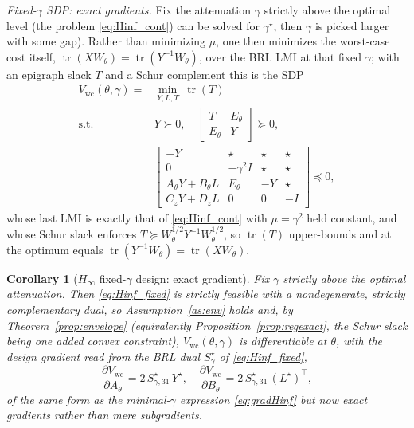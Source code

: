 \documentclass[twocolumn,amsthm]{autart}
\newtheorem{corollary}{Corollary}
\begin{document}
\emph{Fixed-$\gamma$ SDP: exact gradients.} Fix the attenuation $\gamma$
strictly above the optimal level (the problem \eqref{eq:Hinf_cont}) can be solved for $\gamma^\star$, then $\gamma$ is picked larger with some gap). Rather than minimizing $\mu$, one then
minimizes the worst-case cost itself,
$\operatorname{tr}(XW_\theta)=\operatorname{tr}(Y^{-1}W_\theta)$, over the BRL LMI at
that fixed $\gamma$; with an epigraph slack $T$ and a Schur complement this is the SDP
\begin{equation}\label{eq:Hinf_fixed}
\begin{aligned}
V_{\mathrm{wc}}(\theta, \gamma)=&\min_{Y,L,T}\ \operatorname{tr}(T)\\
\text{s.t. } & Y\succ0,\quad
\begin{bmatrix} T & E_\theta\\ E_\theta & Y\end{bmatrix}\succeq0,\\
& \begin{bmatrix}
-Y & \star & \star & \star \\
0 & -\gamma^2 I & \star & \star \\
A_\theta Y + B_\theta L & E_\theta & -Y & \star \\
C_z Y + D_z L & 0 & 0 & -I
\end{bmatrix} \preceq 0,
\end{aligned}
\end{equation}
whose last LMI is exactly that of \eqref{eq:Hinf_cont} with $\mu=\gamma^2$ held
constant, and whose Schur slack enforces
$T\succeq W_\theta^{1/2}Y^{-1}W_\theta^{1/2}$, so $\operatorname{tr}(T)$ upper-bounds and at the optimum equals $\operatorname{tr}(Y^{-1}W_\theta)=\operatorname{tr}(XW_\theta)$.

\begin{corollary}[$H_\infty$ fixed-$\gamma$ design: exact gradient]\label{cor:hinf_fixed}
Fix $\gamma$ strictly above the optimal attenuation. Then \eqref{eq:Hinf_fixed} is
strictly feasible with a nondegenerate, strictly complementary dual, so
Assumption~\ref{as:env} holds and, by Theorem~\ref{prop:envelope} (equivalently
Proposition~\ref{prop:regexact}, the Schur slack being one added convex constraint),
$V_{\mathrm{wc}}(\theta, \gamma)$ is differentiable at $\theta$, with the design
gradient read from the BRL dual $S^\star_\gamma$ of \eqref{eq:Hinf_fixed},
\begin{equation}\label{eq:gradHinf_fixed}
\frac{\partial V_{\mathrm{wc}}}{\partial A_\theta}=2\,S_{\gamma,31}^\star\,Y^\star,\quad
\frac{\partial V_{\mathrm{wc}}}{\partial B_\theta}=2\,S_{\gamma,31}^\star\,(L^\star)^\top,
\end{equation}
of the same form as the minimal-$\gamma$ expression \eqref{eq:gradHinf} but now exact gradients rather than mere subgradients.
\end{corollary}
\end{document}
